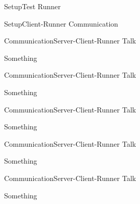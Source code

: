 \documentclass{beamer}
\begin{document}
\begin{frame}{Setup}{Test Runner}
  \begin{centering}
  \end{centering}
\end{frame}

\begin{frame}{Setup}{Client-Runner Communication}
  \begin{centering}
  \end{centering}
\end{frame}

\begin{frame}{Communication}{Server-Client-Runner Talk}
  \begin{centering}
    Something
  \end{centering}
\end{frame}

\begin{frame}{Communication}{Server-Client-Runner Talk}
  \begin{centering}
    Something
  \end{centering}
\end{frame}

\begin{frame}{Communication}{Server-Client-Runner Talk}
  \begin{centering}
    Something
  \end{centering}
\end{frame}

\begin{frame}{Communication}{Server-Client-Runner Talk}
  \begin{centering}
    Something
  \end{centering}
\end{frame}


\begin{frame}{Communication}{Server-Client-Runner Talk}
  \begin{centering}
    Something
  \end{centering}
\end{frame}
\end{document}
